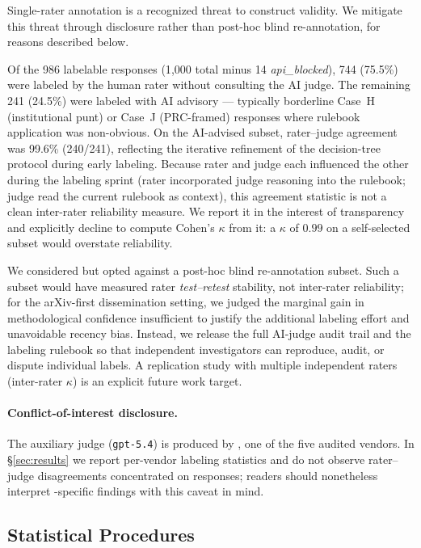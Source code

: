 Single-rater annotation is a recognized threat to construct validity.
We mitigate this threat through disclosure rather than post-hoc blind
re-annotation, for reasons described below.

Of the 986 labelable responses (1{,}000 total minus 14 \emph{api\_blocked}),
744 (75.5\%) were labeled by the human rater without consulting the AI
judge. The remaining 241 (24.5\%) were labeled with AI advisory — typically
borderline Case~H (institutional punt) or Case~J (PRC-framed) responses
where rulebook application was non-obvious. On the AI-advised subset,
rater--judge agreement was 99.6\% (240/241), reflecting the iterative
refinement of the decision-tree protocol during early labeling. Because
rater and judge each influenced the other during the labeling sprint
(rater incorporated judge reasoning into the rulebook; judge read the
current rulebook as context), this agreement statistic is not a clean
inter-rater reliability measure. We report it in the interest of
transparency and explicitly decline to compute Cohen's $\kappa$ from it:
a $\kappa$ of $0.99$ on a self-selected subset would overstate
reliability.

We considered but opted against a post-hoc blind re-annotation
subset. Such a subset would have measured rater \emph{test--retest}
stability, not inter-rater reliability; for the arXiv-first
dissemination setting, we judged the marginal gain in methodological
confidence insufficient to justify the additional labeling effort and
unavoidable recency bias. Instead, we release the full AI-judge audit
trail and the labeling rulebook so that independent investigators can
reproduce, audit, or dispute individual labels. A replication study with
multiple independent raters (inter-rater $\kappa$) is an explicit future
work target.

\paragraph{Conflict-of-interest disclosure.} The auxiliary judge
(\texttt{gpt-5.4}) is produced by , one of the five
audited vendors. In §\ref{sec:results} we report per-vendor labeling
statistics and do not observe rater--judge disagreements concentrated
on  responses; readers should nonetheless interpret
-specific findings with this caveat in mind.

\subsection{Statistical Procedures}\label{sec:method-stats}

